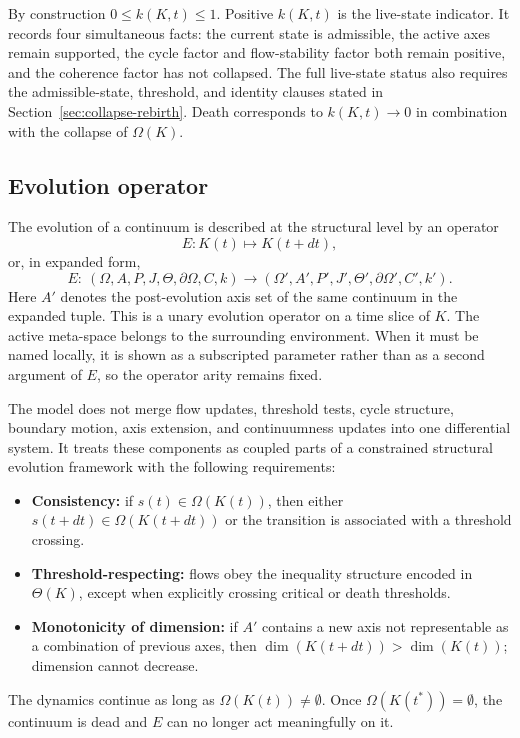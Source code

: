 By construction \(0 \le k(K,t) \le 1\).
Positive \(k(K,t)\) is the live-state indicator. It records four
simultaneous facts: the current state is admissible, the active axes remain
supported, the cycle factor and flow-stability factor both remain positive,
and the coherence factor has not collapsed. The full live-state status
also requires the admissible-state, threshold, and identity clauses stated in
Section~\ref{sec:collapse-rebirth}.
Death corresponds to \(k(K,t)\to 0\) in combination with the collapse of \(\Omega(K)\).

\subsection{Evolution operator}

The evolution of a continuum is described at the structural level by an operator
\[
    E: K(t) \mapsto K(t+dt),
\]
or, in expanded form,
\[
    E:\ (\Omega,A,P,J,\Theta,\partial\Omega,C,k)
    \longrightarrow (\Omega',A',P',J',\Theta',\partial\Omega',C',k').
\]
Here \(A'\) denotes the post-evolution axis set of the same continuum in the
expanded tuple.
This is a unary evolution operator on a time slice of \(K\). The active
meta-space belongs to the surrounding environment. When it must be named
locally, it is shown as a subscripted parameter rather than as a second
argument of \(E\), so the operator arity remains fixed.

The model does not merge flow updates, threshold tests, cycle structure,
boundary motion, axis extension, and continuumness updates into one
differential system. It treats these components as coupled parts of a
constrained structural evolution framework with the following requirements:

\begin{itemize}
    \item \textbf{Consistency:} if \(s(t) \in \Omega(K(t))\), then either \(s(t+dt) \in \Omega(K(t+dt))\) or the transition is associated with a threshold crossing.
    \item \textbf{Threshold-respecting:} flows obey the inequality structure encoded in \(\Theta(K)\), except when explicitly crossing critical or death thresholds.
    \item \textbf{Monotonicity of dimension:} if \(A'\) contains a new axis not representable as a combination of previous axes, then \(\dim(K(t+dt)) > \dim(K(t))\); dimension cannot decrease.
\end{itemize}

The dynamics continue as long as \(\Omega(K(t)) \neq \emptyset\).
Once \(\Omega(K(t^\ast)) = \emptyset\), the continuum is dead and \(E\) can no longer act meaningfully on it.


